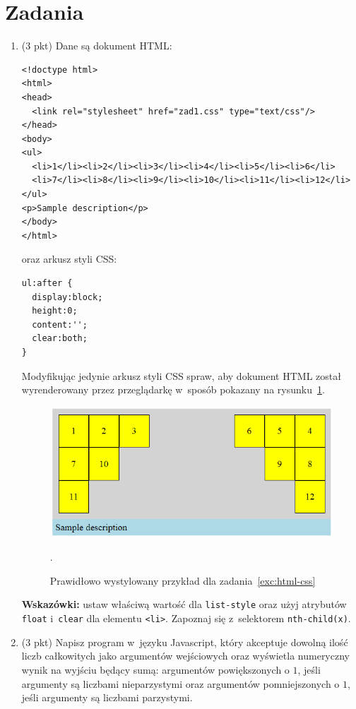 \documentclass[12pt]{article}
\begin{document}
    \section*{Zadania}
    \begin{enumerate}
        \item\label{exc:html-css}
            (3 pkt) Dane są dokument HTML:
            \begin{verbatim}
<!doctype html>
<html>
<head>
  <link rel="stylesheet" href="zad1.css" type="text/css"/>
</head>
<body>
<ul>
  <li>1</li><li>2</li><li>3</li><li>4</li><li>5</li><li>6</li>
  <li>7</li><li>8</li><li>9</li><li>10</li><li>11</li><li>12</li>
</ul>
<p>Sample description</p>
</body>
</html>
            \end{verbatim}
            oraz arkusz styli CSS:
            \begin{verbatim}
ul:after {
  display:block;
  height:0;
  content:'';
  clear:both;
}
            \end{verbatim}
            Modyfikując jedynie arkusz styli CSS spraw, aby dokument HTML został wyrenderowany przez przeglądarkę w~sposób pokazany na rysunku~\ref{fig:css-float}.
            \begin{figure}[hb]
                \centering
                \includegraphics{css-float}
                \caption{Prawidłowo wystylowany przykład dla zadania~\ref{exc:html-css}}.
                \label{fig:css-float}
            \end{figure}

            \textbf{Wskazówki:} ustaw właściwą wartość dla \texttt{list-style} oraz użyj atrybutów \texttt{float} i~\texttt{clear} dla elementu \texttt{<li>}. Zapoznaj się z~selektorem \texttt{nth-child(x)}.
        \item\label{exc:javascript-classic}
            (3 pkt) Napisz program w~języku Javascript, który akceptuje dowolną ilość liczb całkowitych jako argumentów wejściowych oraz wyświetla numeryczny wynik na wyjściu będący sumą: argumentów powiększonych o $1$, jeśli argumenty są liczbami nieparzystymi oraz argumentów pomniejszonych o $1$, jeśli argumenty są liczbami parzystymi.


\end{enumerate}
\end{document}

